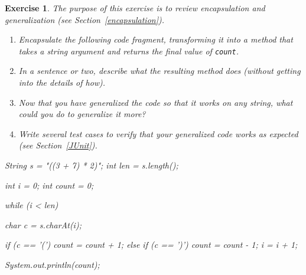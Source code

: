 \documentclass[12pt]{book}
\theoremstyle{exercise}
\newtheorem{exercise}{Exercise}[chapter]
\newcommand{\java}[1]{\verb"#1"}
\newcommand{\java}[1]{\lstinline{#1}} %
\begin{document}
\begin{exercise}

The purpose of this exercise is to review encapsulation and generalization (see Section~\ref{encapsulation}).

\begin{enumerate}

\item Encapsulate the following code fragment, transforming it into a method that takes a string argument and returns the final value of \java{count}.

\item In a sentence or two, describe what the resulting method does (without getting into the details of how).

\item Now that you have generalized the code so that it works on any string, what could you do to generalize it more?

\item Write several test cases to verify that your generalized code works as expected (see Section~\ref{JUnit}).

\end{enumerate}

\begin{code}
    String s = "((3 + 7) * 2)";
    int len = s.length();

    int i = 0;
    int count = 0;

    while (i < len) {
        char c = s.charAt(i);

        if (c == '(') {
            count = count + 1;
        } else if (c == ')') {
            count = count - 1;
        }
        i = i + 1;
    }

    System.out.println(count);
\end{code}

\end{exercise}
\end{document}
